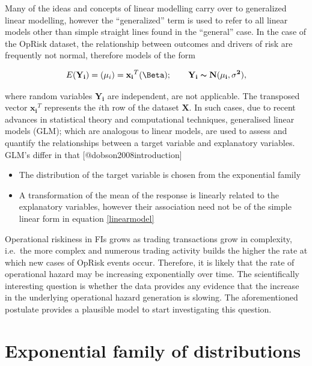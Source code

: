 \documentclass[]{article}
\begin{document}
Many of the ideas and concepts of linear modelling carry over to
generalized linear modelling, however the ``generalized'' term is used
to refer to all linear models other than simple straight lines found in
the ``general'' case. In the case of the OpRisk dataset, the
relationship between outcomes and drivers of risk are frequently not
normal, therefore models of the form

\singlespacing

\begin{eqnarray}\label{linearmodel}
E(\mathbf{Y_i}) = \mathbf(\mu_i) = \mathbf{x_i}^T\mathbf(\Beta); \qquad \mathbf{Y_i} \thicksim \mathbf{N(\mu_i, \sigma^2)},
\end{eqnarray} \doublespacing

where random variables \(\mathbf{Y_i}\) are independent, are not
applicable. The transposed vector \(\mathbf{x_i}^T\) represents the
\(i\)th row of the dataset \(\mathbf{X}\). In such cases, due to recent
advances in statistical theory and computational techniques, generalised
linear models (GLM); which are analogous to linear models, are used to
assess and quantify the relationships between a target variable and
explanatory variables. GLM's differ in that
{[}@dobson2008introduction{]}

\begin{itemize}
\item The distribution of the target variable is chosen from the exponential family
\item A transformation of the mean of the response is linearly related to the explanatory variables, however their association need not be of the simple linear form in equation \ref{linearmodel}
\end{itemize}

Operational riskiness in FIs grows as trading transactions grow in
complexity, i.e.~the more complex and numerous trading activity builds
the higher the rate at which new cases of OpRisk events occur.
Therefore, it is likely that the rate of operational hazard may be
increasing exponentially over time. The scientifically interesting
question is whether the data provides any evidence that the increase in
the underlying operational hazard generation is slowing. The
aforementioned postulate provides a plausible model to start
investigating this question.\medskip

\section{Exponential family of distributions}
\label{sec: Exponential family of distributions}
\end{document}
